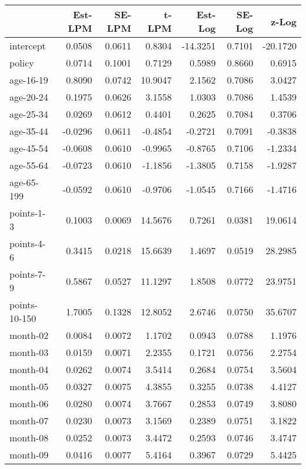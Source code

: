 \documentclass[10pt]{article}
\begin{document}
\begin{table}[ht]
\centering
\begin{tabular}{lrrrrrr}
  \hline
 & Est-LPM & SE-LPM & t-LPM & Est-Log & SE-Log & z-Log \\ 
  \hline
intercept & 0.0508 & 0.0611 & 0.8304 & -14.3251 & 0.7101 & -20.1720 \\ 
  policy & 0.0714 & 0.1001 & 0.7129 & 0.5989 & 0.8660 & 0.6915 \\ 
  age-16-19 & 0.8090 & 0.0742 & 10.9047 & 2.1562 & 0.7086 & 3.0427 \\ 
  age-20-24 & 0.1975 & 0.0626 & 3.1558 & 1.0303 & 0.7086 & 1.4539 \\ 
  age-25-34 & 0.0269 & 0.0612 & 0.4401 & 0.2625 & 0.7084 & 0.3706 \\ 
  age-35-44 & -0.0296 & 0.0611 & -0.4854 & -0.2721 & 0.7091 & -0.3838 \\ 
  age-45-54 & -0.0608 & 0.0610 & -0.9965 & -0.8765 & 0.7106 & -1.2334 \\ 
  age-55-64 & -0.0723 & 0.0610 & -1.1856 & -1.3805 & 0.7158 & -1.9287 \\ 
  age-65-199 & -0.0592 & 0.0610 & -0.9706 & -1.0545 & 0.7166 & -1.4716 \\ 
  points-1-3 & 0.1003 & 0.0069 & 14.5676 & 0.7261 & 0.0381 & 19.0614 \\ 
  points-4-6 & 0.3415 & 0.0218 & 15.6639 & 1.4697 & 0.0519 & 28.2985 \\ 
  points-7-9 & 0.5867 & 0.0527 & 11.1297 & 1.8508 & 0.0772 & 23.9751 \\ 
  points-10-150 & 1.7005 & 0.1328 & 12.8052 & 2.6746 & 0.0750 & 35.6707 \\ 
  month-02 & 0.0084 & 0.0072 & 1.1702 & 0.0943 & 0.0788 & 1.1976 \\ 
  month-03 & 0.0159 & 0.0071 & 2.2355 & 0.1721 & 0.0756 & 2.2754 \\ 
  month-04 & 0.0262 & 0.0074 & 3.5414 & 0.2684 & 0.0754 & 3.5604 \\ 
  month-05 & 0.0327 & 0.0075 & 4.3855 & 0.3255 & 0.0738 & 4.4127 \\ 
  month-06 & 0.0280 & 0.0074 & 3.7667 & 0.2853 & 0.0749 & 3.8080 \\ 
  month-07 & 0.0230 & 0.0073 & 3.1569 & 0.2389 & 0.0751 & 3.1822 \\ 
  month-08 & 0.0252 & 0.0073 & 3.4472 & 0.2593 & 0.0746 & 3.4747 \\ 
  month-09 & 0.0416 & 0.0077 & 5.4164 & 0.3967 & 0.0729 & 5.4425 \\ 

\end{tabular}
\end{table}
\end{document}
